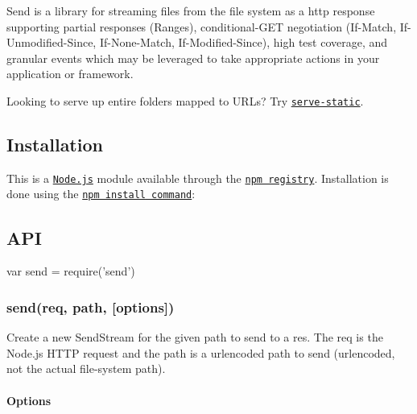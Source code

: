 \href{https://npmjs.org/package/send}{\tt } \href{https://npmjs.org/package/send}{\tt } \href{https://travis-ci.org/pillarjs/send}{\tt } \href{https://ci.appveyor.com/project/dougwilson/send}{\tt } \href{https://coveralls.io/r/pillarjs/send?branch=master}{\tt }

Send is a library for streaming files from the file system as a http response supporting partial responses (Ranges), conditional-\/\+G\+ET negotiation (If-\/\+Match, If-\/\+Unmodified-\/\+Since, If-\/\+None-\/\+Match, If-\/\+Modified-\/\+Since), high test coverage, and granular events which may be leveraged to take appropriate actions in your application or framework.

Looking to serve up entire folders mapped to U\+R\+Ls? Try \href{https://www.npmjs.org/package/serve-static}{\tt serve-\/static}.

\subsection*{Installation}

This is a \href{https://nodejs.org/en/}{\tt Node.\+js} module available through the \href{https://www.npmjs.com/}{\tt npm registry}. Installation is done using the \href{https://docs.npmjs.com/getting-started/installing-npm-packages-locally}{\tt {\ttfamily npm install} command}\+:




\subsection*{A\+PI}


\begin{DoxyCode}
var send = require('send')
\end{DoxyCode}


\subsubsection*{send(req, path, \mbox{[}options\mbox{]})}

Create a new {\ttfamily Send\+Stream} for the given path to send to a {\ttfamily res}. The {\ttfamily req} is the Node.\+js H\+T\+TP request and the {\ttfamily path} is a urlencoded path to send (urlencoded, not the actual file-\/system path).

\paragraph*{Options}

